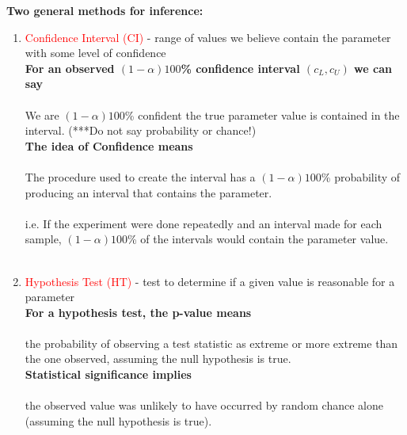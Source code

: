 \noindent\Large \textbf{Two general methods for inference:}\large\\
\begin{enumerate}
\item 
\textcolor{red}{Confidence Interval (CI)}
- range of values we believe contain the parameter with some level of confidence\\

\textbf{For an observed $(1-\alpha)100$\% confidence interval $(c_{L}, c_{U})$ we can say}\\~\\
We are $(1-\alpha)100$\% confident the true parameter value is contained in the interval.  (***Do not say probability or chance!)\\

\textbf{The idea of Confidence means}\\~\\
The procedure used to create the interval has a $(1-\alpha)100$\% probability of producing an interval that contains the parameter.\\~\\
i.e. If the experiment were done repeatedly and an interval made for each sample, $(1-\alpha)100$\% of the intervals would contain the parameter value.\\~\\

\item
\textcolor{red}{Hypothesis Test (HT)}
- test to determine if a given value is reasonable for a parameter\\

\textbf{For a hypothesis test, the p-value means}\\~\\
the probability of observing a test statistic as extreme or more extreme than the one observed, assuming the null hypothesis is true.\\

\textbf{Statistical significance implies}\\~\\
the observed value was unlikely to have occurred by random chance alone (assuming the null hypothesis is true).\\~\\
\end{enumerate}

